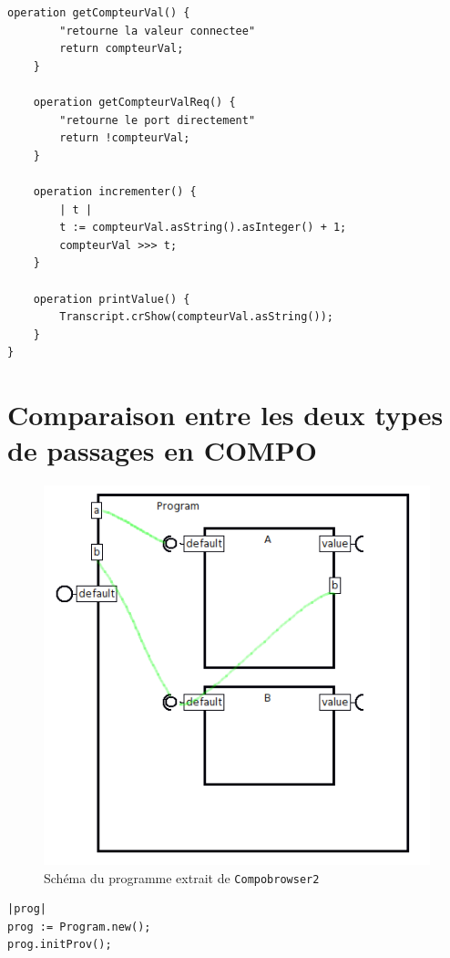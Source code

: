 \documentclass[11pt,a4paper,openany,oneside]{book}
\begin{document}
\begin{appendices}
\begin{lstlisting}[language=Compo, frame=single, caption=Programme Compteur]
	operation getCompteurVal() {
	    "retourne la valeur connectee"
		return compteurVal;
	}
	
	operation getCompteurValReq() {
	    "retourne le port directement"
		return !compteurVal;
	}
	
	operation incrementer() {
	    | t |
	    t := compteurVal.asString().asInteger() + 1;
	    compteurVal >>> t;
	}
	
	operation printValue() {
	    Transcript.crShow(compteurVal.asString());
	}
}
\end{lstlisting}


\chapter{Comparaison entre les deux types de passages en COMPO}




\begin{figure}[H]
\centering
\includegraphics[scale=0.7, keepaspectratio=true]{passagereqprov}
\caption{Schéma du programme extrait de \texttt{Compobrowser2}}
\label{compteursuiveur}
\end{figure}



\newpage

\begin{lstlisting}[language=Compo, frame=single, caption=Workspace (Passage par Fournis)]
|prog|
prog := Program.new();
prog.initProv();


\end{lstlisting}
\end{appendices}
\end{document}
